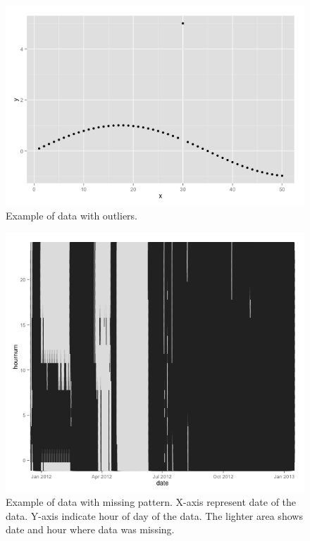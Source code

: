 \documentclass[conference]{IEEEtran}
\begin{document}
\begin{figure}
	\includegraphics[width=\linewidth]{figure1.png}
	\caption{Example of data with outliers.}
	\label{fig:example_outliers}
\end{figure}

\begin{figure}
	\includegraphics[width=\linewidth]{figure3.png}
	\caption{Example of data with missing pattern. X-axis represent date of the data. Y-axis indicate hour of day of the data. The lighter area shows date and hour where data was missing.}
	\label{fig:example_missingpattern}
\end{figure}
\end{document}
